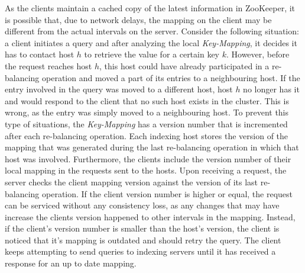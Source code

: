 \documentclass[11pt,a4paper]{globis-book}
\begin{document}
As the clients maintain a cached copy of the latest information in ZooKeeper, it is possible that, due to network delays, the mapping on the client may be different from the actual intervals on the server. Consider the following situation: a client initiates a query and after analyzing the local \textit{Key-Mapping}, it decides it has to contact host $h$ to retrieve the value for a certain key $k$. However, before the request reaches host $h$, this host could have already participated in a re-balancing operation and moved a part of its entries to a neighbouring host. If the entry involved in the query was moved to a different host, host $h$ no longer has it and would respond to the client that no such host exists in the cluster. This is wrong, as the entry was simply moved to a neighbouring host. To prevent this type of situations, the \textit{Key-Mapping} has a version number that is incremented after each re-balancing operation. Each indexing host stores the version of the mapping that was generated during the last re-balancing operation in which that host was involved. Furthermore, the clients include the version number of their local mapping in the requests sent to the hosts. Upon receiving a request, the server checks the client mapping version against the version of its last re-balancing operation. If the client version number is higher or equal, the request can be serviced without any consistency loss, as any changes that may have increase the clients version happened to other intervals in the mapping. Instead, if the client's version number is smaller than the host's version, the client is noticed that it's mapping is outdated and should retry the query. The client keeps attempting to send queries to indexing servers until it has received a response for an up to date mapping. 
\end{document}
